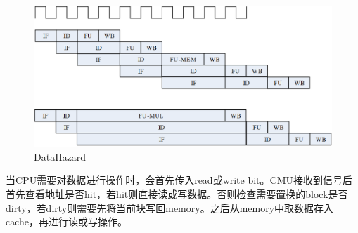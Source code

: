 \begin{figure}[H] %
	\centering %
	\includegraphics[width=1.0\textwidth]{figs/DataHazard.png} %
	\caption{DataHazard} %
	\label{Fig.2} %
\end{figure}
当CPU需要对数据进行操作时，会首先传入read或write bit。CMU接收到信号后首先查看地址是否hit，若hit则直接读或写数据。否则检查需要置换的block是否dirty，若dirty则需要先将当前块写回memory。之后从memory中取数据存入cache，再进行读或写操作。
